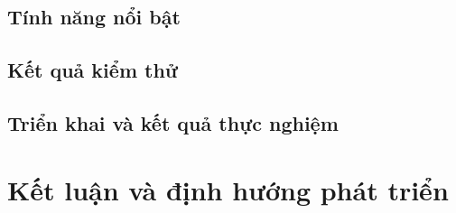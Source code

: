 \documentclass{report}
\begin{document}
\section{Tính năng nổi bật}


\section{Kết quả kiểm thử}


\section{Triển khai và kết quả thực nghiệm}


\chapter{Kết luận và định hướng phát triển}


\nocite{*}
\printbibliography[heading=bibintoc, title=Tài liệu tham khảo]



\end{document}

